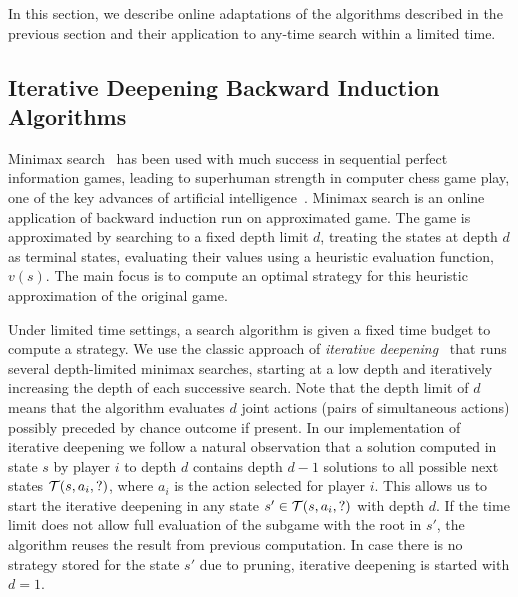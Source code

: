 
In this section, we describe online adaptations of the algorithms described in the previous section and their application
to any-time search within a limited time.

\subsection{Iterative Deepening Backward Induction Algorithms} \label{sec:idbi}

Minimax search~\cite{AIbook} has been used with much success in sequential perfect information games,
leading to superhuman strength in computer chess game play, one of the key advances of artificial
intelligence~\cite{Campbell02deepblue}.
Minimax search is an online application of backward induction run on approximated game.
The game is approximated by searching to a fixed depth limit $d$, treating the states at depth $d$
as terminal states, evaluating their values using a heuristic evaluation function, $v(s)$.
The main focus is to compute an optimal strategy for this heuristic approximation of the original game.

Under limited time settings, a search algorithm is given a fixed time budget to compute a strategy.
We use the classic approach of {\it iterative deepening}~\cite{AIbook} that runs several depth-limited
minimax searches, starting at a low depth and iteratively increasing the depth of each successive search.
Note that the depth limit of $d$ means that the algorithm evaluates $d$ joint actions (\ie pairs of simultaneous actions) possibly preceded by chance outcome if present.
In our implementation of iterative deepening we follow a natural observation that a solution computed in state $s$ by player $i$ to depth $d$ contains depth $d-1$ solutions to all possible next states $\mathcal{T}(s,a_i,?)$, where $a_i$ is the action selected for player $i$.
This allows us to start the iterative deepening in any state $s' \in \mathcal{T}(s,a_i,?)$ with depth $d$.
If the time limit does not allow full evaluation of the subgame with the root in $s'$, the algorithm reuses the result from previous computation.
In case there is no strategy stored for the state $s'$ due to pruning, iterative deepening is started with $d = 1$.

